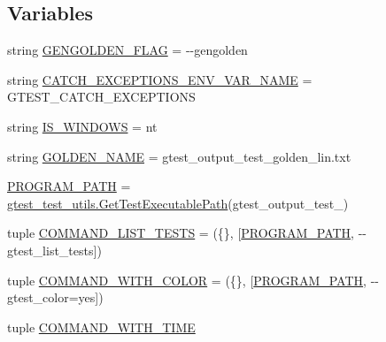\subsection*{Variables}
\begin{DoxyCompactItemize}
\item 
string \hyperlink{namespacegtest__output__test_a25addad68fc28461f31e7f473bb7643f}{G\+E\+N\+G\+O\+L\+D\+E\+N\+\_\+\+F\+L\+AG} = \textquotesingle{}-\/-\/gengolden\textquotesingle{}
\item 
string \hyperlink{namespacegtest__output__test_a3b2d61497a354f214b5a086dcff420ee}{C\+A\+T\+C\+H\+\_\+\+E\+X\+C\+E\+P\+T\+I\+O\+N\+S\+\_\+\+E\+N\+V\+\_\+\+V\+A\+R\+\_\+\+N\+A\+ME} = \textquotesingle{}G\+T\+E\+S\+T\+\_\+\+C\+A\+T\+C\+H\+\_\+\+E\+X\+C\+E\+P\+T\+I\+O\+NS\textquotesingle{}
\item 
string \hyperlink{namespacegtest__output__test_a76e823e0e56e3c25aa8b0aab4431f763}{I\+S\+\_\+\+W\+I\+N\+D\+O\+WS} = \textquotesingle{}nt\textquotesingle{}
\item 
string \hyperlink{namespacegtest__output__test_a317ece7d11d9103a7bdbf0320b64a981}{G\+O\+L\+D\+E\+N\+\_\+\+N\+A\+ME} = \textquotesingle{}gtest\+\_\+output\+\_\+test\+\_\+golden\+\_\+lin.\+txt\textquotesingle{}
\item 
\hyperlink{namespacegtest__output__test_a92a4b0bd0a29b350050d03bccb125f60}{P\+R\+O\+G\+R\+A\+M\+\_\+\+P\+A\+TH} = \hyperlink{namespacegtest__test__utils_a89ed3717984a80ffbb7a9c92f71b86a2}{gtest\+\_\+test\+\_\+utils.\+Get\+Test\+Executable\+Path}(\textquotesingle{}gtest\+\_\+output\+\_\+test\+\_\+\textquotesingle{})
\item 
tuple \hyperlink{namespacegtest__output__test_ad57de209fb07e1002c8a929dd8a15dc9}{C\+O\+M\+M\+A\+N\+D\+\_\+\+L\+I\+S\+T\+\_\+\+T\+E\+S\+TS} = (\{\}, \mbox{[}\hyperlink{namespacegtest__output__test_a92a4b0bd0a29b350050d03bccb125f60}{P\+R\+O\+G\+R\+A\+M\+\_\+\+P\+A\+TH}, \textquotesingle{}-\/-\/gtest\+\_\+list\+\_\+tests\textquotesingle{}\mbox{]})
\item 
tuple \hyperlink{namespacegtest__output__test_adbeb34904b377333d8168d1b54584b53}{C\+O\+M\+M\+A\+N\+D\+\_\+\+W\+I\+T\+H\+\_\+\+C\+O\+L\+OR} = (\{\}, \mbox{[}\hyperlink{namespacegtest__output__test_a92a4b0bd0a29b350050d03bccb125f60}{P\+R\+O\+G\+R\+A\+M\+\_\+\+P\+A\+TH}, \textquotesingle{}-\/-\/gtest\+\_\+color=yes\textquotesingle{}\mbox{]})
\item 
tuple \hyperlink{namespacegtest__output__test_a1c27d93a57990d21461436f2d5ff3064}{C\+O\+M\+M\+A\+N\+D\+\_\+\+W\+I\+T\+H\+\_\+\+T\+I\+ME}
\item 

\end{DoxyCompactItemize}
